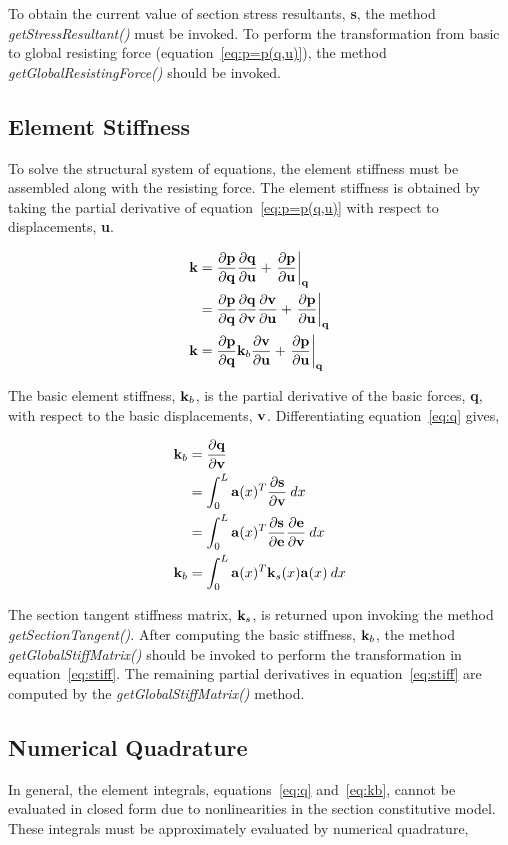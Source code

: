 \documentclass[12pt]{article}
\begin{document}
To obtain the current value of section stress resultants, {\bf s}, the method
{\em getStressResultant()} must be invoked. To perform the transformation from
basic to global resisting force (equation~\ref{eq:p=p(q,u)}), the method
{\em getGlobalResistingForce()} should be invoked.

\subsection{Element Stiffness}
To solve the structural system of equations, the element stiffness must be assembled
along with the resisting force. The element stiffness is obtained by taking the
partial derivative of equation~\ref{eq:p=p(q,u)} with respect to displacements,
{\bf u}.

\begin{align}
{\bf k} &= \frac{\partial{\bf p}}{\partial{\bf q}}\frac{\partial{\bf q}}{\partial{\bf u}} + \left.\frac{\partial{\bf p}}{\partial{\bf u}}\right|_{\bf q} \\
&= \frac{\partial{\bf p}}{\partial{\bf q}} \frac{\partial{\bf q}}{\partial{\bf v}} \frac{\partial{\bf v}}{\partial{\bf u}} +
\left.\frac{\partial{\bf p}}{\partial{\bf u}}\right|_{\bf q} \\
{\bf k} &= \label{eq:stiff} \frac{\partial{\bf p}}{\partial{\bf q}} {\bf k}_b \frac{\partial{\bf v}}{\partial{\bf u}} +
\left.\frac{\partial{\bf p}}{\partial{\bf u}}\right|_{\bf q}
\end{align}

\noindent The basic element stiffness, ${\bf k}_b$, is the partial derivative
of the basic forces, {\bf q}, with respect to the basic displacements, ${\bf v}$.
Differentiating equation~\ref{eq:q} gives,

\begin{align}
{\bf k}_b &= \frac{\partial{\bf q}}{\partial{\bf v}} \\
&= \int_0^L {\bf a}(x)^T \frac{\partial{\bf s}}{\partial{\bf v}} \: dx \\
&= \int_0^L {\bf a}(x)^T \frac{\partial{\bf s}}{\partial{\bf e}} \frac{\partial{\bf e}}{\partial{\bf v}} \: dx \\
{\bf k}_b &= \label{eq:kb} \int_0^L {\bf a}(x)^T {\bf k}_s(x) {\bf a}(x) \: dx
\end{align}

The section tangent stiffness matrix, ${\bf k}_s$, is returned upon invoking the
method {\em getSectionTangent()}. After computing the basic stiffness, ${\bf k}_b$,
the method {\em getGlobalStiffMatrix()} should be invoked to perform the
transformation in equation~\ref{eq:stiff}. The remaining partial derivatives in
equation~\ref{eq:stiff} are computed by the {\em getGlobalStiffMatrix()} method.

\subsection{Numerical Quadrature}
In general, the element integrals, equations~\ref{eq:q} and~\ref{eq:kb}, cannot
be evaluated in closed form due to nonlinearities in the section constitutive model.
These integrals must be approximately evaluated by numerical quadrature,
\end{document}
